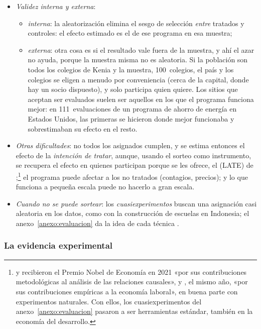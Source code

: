 \documentclass[11pt]{article}
\begin{document}
\begin{itemize}
\item \emph{Validez interna y externa}:
  \begin{itemize}
  \item \emph{interna}: la aleatorización elimina el sesgo de selección \emph{entre} tratados y controles: el efecto estimado es el de ese programa en esa muestra;
  \item \emph{externa}: otra cosa es si el resultado vale fuera de la muestra, y ahí el azar no ayuda, porque la muestra misma no es aleatoria. Si la población son todos los colegios de Kenia y la muestra, 100~colegios, el país y los colegios se eligen a menudo por conveniencia (cerca de la capital, donde hay un socio dispuesto), y solo participa quien quiere. Los sitios que aceptan ser evaluados suelen ser aquellos en los que el programa funciona mejor: en 111~evaluaciones de un programa de ahorro de energía en Estados Unidos, las primeras se hicieron donde mejor funcionaba y sobrestimaban su efecto en el resto\nocite{Allcott2015}.
  \end{itemize}
\item \emph{Otras dificultades}: no todos los asignados cumplen, y se estima entonces el efecto de la \emph{intención de tratar}, aunque, usando el sorteo como instrumento, se recupera el efecto en quienes participan porque se les ofrece, el  (LATE) de \textcite{ImbensAngrist1994Identification};\footnote{ y  recibieron el Premio Nobel de Economía en 2021 «por sus contribuciones metodológicas al análisis de las relaciones causales», y , el mismo año, «por sus contribuciones empíricas a la economía laboral», en buena parte con experimentos naturales\nocite{Nobel2021CardAngristImbens}. Con ellos, los cuasiexperimentos del anexo~\ref{anexo:evaluacion} pasaron a ser herramientas estándar, también en la economía del desarrollo.} el programa puede afectar a los no tratados (contagios, precios); y lo que funciona a pequeña escala puede no hacerlo a gran escala\nocite{DufloGlennersterKremer2007}.
\item \emph{Cuando no se puede sortear}: los \emph{cuasiexperimentos} buscan una asignación casi aleatoria en los datos, como \textcite{Duflo2001} con la construcción de escuelas en Indonesia; el anexo~\ref{anexo:evaluacion} da la idea de cada técnica .
\end{itemize}

\subsubsection{La evidencia experimental}\label{sec:evidencia}
\end{document}
